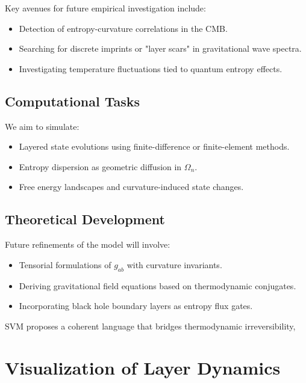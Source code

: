 \documentclass[11pt]{article}
\begin{document}
Key avenues for future empirical investigation include:
\begin{itemize}
    \item Detection of entropy-curvature correlations in the CMB.
    \item Searching for discrete imprints or "layer scars" in gravitational wave spectra.
    \item Investigating temperature fluctuations tied to quantum entropy effects.
\end{itemize}

\subsection*{Computational Tasks}

We aim to simulate:
\begin{itemize}
    \item Layered state evolutions using finite-difference or finite-element methods.
    \item Entropy dispersion as geometric diffusion in $\Omega_n$.
    \item Free energy landscapes and curvature-induced state changes.
\end{itemize}

\subsection*{Theoretical Development}

Future refinements of the model will involve:
\begin{itemize}
    \item Tensorial formulations of $g_{ab}$ with curvature invariants.
    \item Deriving gravitational field equations based on thermodynamic conjugates.
    \item Incorporating black hole boundary layers as entropy flux gates.
\end{itemize}

SVM proposes a coherent language that bridges thermodynamic irreversibility,


\section{Visualization of Layer Dynamics}
\end{document}
